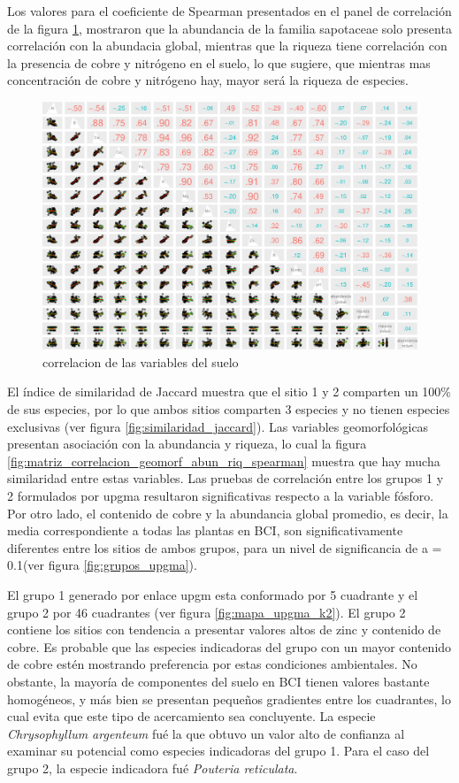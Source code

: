 \documentclass[11pt,]{article}
\begin{document}
Los valores para el coeficiente de Spearman presentados en el panel de
correlación de la figura \ref{fig:p_cor_suelo_ar}, mostraron que la
abundancia de la familia sapotaceae solo presenta correlación con la
abundacia global, mientras que la riqueza tiene correlación con la
presencia de cobre y nitrógeno en el suelo, lo que sugiere, que mientras
mas concentración de cobre y nitrógeno hay, mayor será la riqueza de
especies.

\begin{figure}
\centering
\includegraphics{manuscrito_files/figure-latex/unnamed-chunk-4-1.pdf}
\caption{\label{fig:p_cor_suelo_ar}correlacion de las variables del
suelo}
\end{figure}

El índice de similaridad de Jaccard muestra que el sitio 1 y 2 comparten
un 100\% de sus especies, por lo que ambos sitios comparten 3 especies y
no tienen especies exclusivas (ver figura
\ref{fig:similaridad_jaccard}). Las variables geomorfológicas presentan
asociación con la abundancia y riqueza, lo cual la figura
\ref{fig:matriz_correlacion_geomorf_abun_riq_spearman} muestra que hay
mucha similaridad entre estas variables. Las pruebas de correlación
entre los grupos 1 y 2 formulados por upgma resultaron significativas
respecto a la variable fósforo. Por otro lado, el contenido de cobre y
la abundancia global promedio, es decir, la media correspondiente a
todas las plantas en BCI, son significativamente diferentes entre los
sitios de ambos grupos, para un nivel de significancia de a = 0.1(ver
figura \ref{fig:grupos_upgma}).

El grupo 1 generado por enlace upgm esta conformado por 5 cuadrante y el
grupo 2 por 46 cuadrantes (ver figura \ref{fig:mapa_upgma_k2}). El grupo
2 contiene los sitios con tendencia a presentar valores altos de zinc y
contenido de cobre. Es probable que las especies indicadoras del grupo
con un mayor contenido de cobre estén mostrando preferencia por estas
condiciones ambientales. No obstante, la mayoría de componentes del
suelo en BCI tienen valores bastante homogéneos, y más bien se presentan
pequeños gradientes entre los cuadrantes, lo cual evita que este tipo de
acercamiento sea concluyente. La especie \emph{Chrysophyllum argenteum}
fué la que obtuvo un valor alto de confianza al examinar su potencial
como especies indicadoras del grupo 1. Para el caso del grupo 2, la
especie indicadora fué \emph{Pouteria reticulata}.
\end{document}
